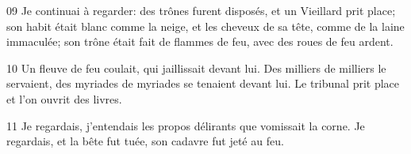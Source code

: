 09 Je continuai à regarder: des trônes furent disposés, et un Vieillard prit place; son habit était blanc comme la neige, et les cheveux de sa tête, comme de la laine immaculée; son trône était fait de flammes de feu, avec des roues de feu ardent.

10 Un fleuve de feu coulait, qui jaillissait devant lui. Des milliers de milliers le servaient, des myriades de myriades se tenaient devant lui. Le tribunal prit place et l’on ouvrit des livres.

11 Je regardais, j’entendais les propos délirants que vomissait la corne. Je regardais, et la bête fut tuée, son cadavre fut jeté au feu.